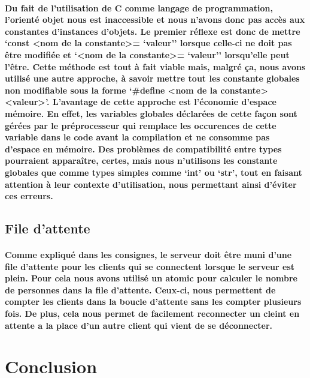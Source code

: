 \documentclass[utf8]{article}
\begin{document}
\paragraph{Du fait de l'utilisation de C comme langage de programmation, l'orienté objet nous est inaccessible et nous n'avons donc pas accès aux constantes d'instances d'objets. 
Le premier réflexe est donc de mettre `const \textless nom de la constante\textgreater= `valeur'' lorsque celle-ci ne doit pas être modifiée et `\textless nom de la 
constante\textgreater = `valeur'' lorsqu'elle peut l'être. Cette méthode est tout à fait viable mais, malgré ça, nous avons utilisé une autre approche, à savoir mettre tout 
les constante globales non modifiable sous la forme `\#define \textless nom de la constante\textgreater \textless valeur\textgreater'. L'avantage de cette approche est l'économie d'espace mémoire. 
En effet, les variables globales déclarées de cette façon sont gérées par le préprocesseur qui remplace les occurences de cette variable dans le code avant la compilation et ne consomme pas d'espace en mémoire.
Des problèmes de compatibilité entre types pourraient apparaître, certes, mais nous n'utilisons les constante globales que comme types simples comme `int' ou `str', tout en
faisant attention à leur contexte d'utilisation, nous permettant ainsi d'éviter ces erreurs.}

\subsection{File d'attente}
\paragraph{ Comme expliqué dans les consignes, le serveur doit être muni d'une file d'attente pour les clients qui se connectent lorsque le serveur est plein.
Pour cela nous avons utilisé un atomic pour calculer le nombre de personnes dans la file d'attente. Ceux-ci, nous permettent de compter les clients dans la boucle d'attente sans les compter plusieurs fois.
De plus, cela nous permet de facilement reconnecter un cleint en attente a la place d'un autre client qui vient de se déconnecter.}

\section{Conclusion}
\end{document}
